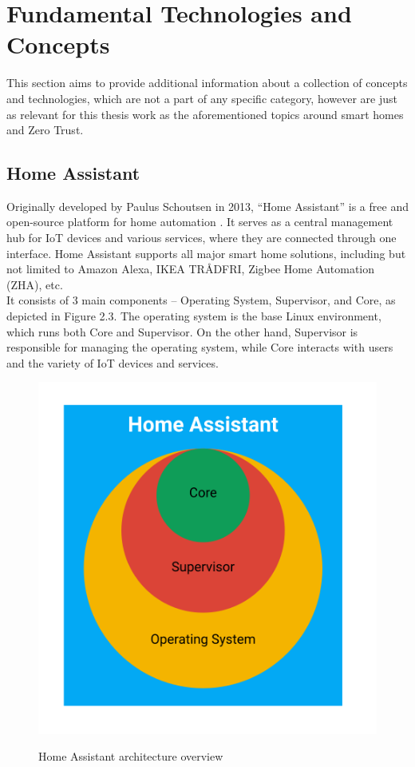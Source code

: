 \section{Fundamental Technologies and Concepts}
This section aims to provide additional information about a collection of concepts and technologies, which are not a part of any specific category, however are just as relevant for this thesis work as the aforementioned topics around smart homes and Zero Trust.

\subsection{Home Assistant}
Originally developed by Paulus Schoutsen in 2013, “Home Assistant” is a free and open-source platform for home automation \cite{home_assistant_wiki}. It serves as a central management hub for IoT devices and various services, where they are connected through one interface. Home Assistant supports all major smart home solutions, including but not limited to Amazon Alexa, IKEA TRÅDFRI, Zigbee Home Automation (ZHA), etc.\\
It consists of 3 main components -- Operating System, Supervisor, and Core, as depicted in Figure 2.3. The operating system is the base Linux environment, which runs both Core and Supervisor. On the other hand, Supervisor is responsible for managing the operating system, while Core interacts with users and the variety of IoT devices and services. \cite{home_assistant_arch}

\begin{figure}[H]
	\centering
	\includegraphics[width=0.5 \linewidth]{Images/ha_arch.png}
	\caption{Home Assistant architecture overview}
	\label{fig:Home_Ass_Arch}
    \cite{home_assistant_arch}
\end{figure}

